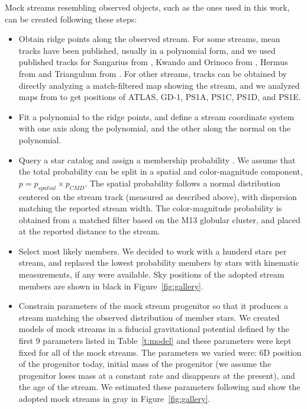 \documentclass[modern]{aastex62}
\begin{document}
Mock streams resembling observed objects, such as the ones used in this work, can be created following these steps:
\begin{itemize}
\item Obtain ridge points along the observed stream.
For some streams, mean tracks have been published, usually in a polynomial form, and we used published tracks for Sangarius from \citet{grillmair2017a}, Kwando and Orinoco from \citet{grillmair2017b}, Hermus from \citet{grillmair2014} and Triangulum from \citet{bonaca2012}.
For other streams, tracks can be obtained by directly analyzing a match-filtered map showing the stream, and we analyzed maps from \citet{bernard2016} to get positions of ATLAS, GD-1, PS1A, PS1C, PS1D, and PS1E.
 
\item Fit a polynomial to the ridge points, and define a stream coordinate system with one axis along the polynomial, and the other along the normal on the polynomial.

\item Query a star catalog and assign a membership probability \citep[we used PanSTARRS1,][]{ps1,schlafly2012,schlafly2011}.
We assume that the total probability can be split in a spatial and color-magnitude component, $p = p_{spatial} \times p_{CMD}$.
The spatial probability follows a normal distribution centered on the stream track (measured as described above), with dispersion matching the reported stream width.
The color-magnitude probability is obtained from a matched filter based on the M13 globular cluster, and placed at the reported distance to the stream.

\item Select most likely members.
We decided to work with a hunderd stars per stream, and replaced the lowest probability members by stars with kinematic measurements, if any were available.
Sky positions of the adopted stream members are shown in black in Figure~\ref{fig:gallery}.

\item Constrain parameters of the mock stream progenitor so that it produces a stream matching the observed distribution of member stars.
We created models of mock streams in a fiducial gravitational potential defined by the first 9 parameters listed in Table~\ref{t:model} and these parameters were kept fixed for all of the mock streams.
The parameters we varied were: 6D position of the progenitor today, initial mass of the progenitor (we assume the progenitor loses mass at a constant rate and disappears at the present), and the age of the stream.
We estimated these parameters following \citet{bonaca2014} and show the adopted mock streams in gray in Figure~\ref{fig:gallery}.
\end{itemize}
\end{document}
